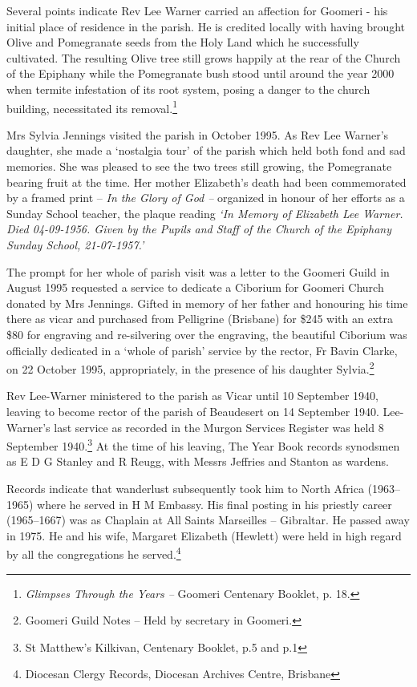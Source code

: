 Several points indicate Rev Lee Warner carried an affection for Goomeri - his initial place of residence in the parish. He is credited locally with having brought Olive and Pomegranate seeds from the Holy Land which he successfully cultivated. The resulting Olive tree still grows happily at the rear of the Church of the Epiphany while the Pomegranate bush stood until around the year 2000 when termite infestation of its root system, posing a danger to the church building, necessitated its removal.\footnote{\emph{Glimpses Through the Years --} Goomeri Centenary Booklet, p. 18.}

Mrs Sylvia Jennings visited the parish in October 1995. As Rev Lee Warner's daughter, she made a `nostalgia tour' of the parish which held both fond and sad memories. She was pleased to see the two trees still growing, the Pomegranate bearing fruit at the time. Her mother Elizabeth's death had been commemorated by a framed print -- \emph{In the Glory of God --} organized in honour of her efforts as a Sunday School teacher, the plaque reading \emph{`In Memory of Elizabeth Lee Warner. Died 04-09-1956. Given by the Pupils and Staff of the Church of the Epiphany Sunday School, 21-07-1957.'}

The prompt for her whole of parish visit was a letter to the Goomeri Guild in August 1995 requested a service to dedicate a Ciborium for Goomeri Church donated by Mrs Jennings. Gifted in memory of her father and honouring his time there as vicar and purchased from Pelligrine (Brisbane) for \$245 with an extra \$80 for engraving and re-silvering over the engraving, the beautiful Ciborium was officially dedicated in a `whole of parish' service by the rector, Fr Bavin Clarke, on 22 October 1995, appropriately, in the presence of his daughter Sylvia.\footnote{Goomeri Guild Notes -- Held by secretary in Goomeri.}

Rev Lee-Warner ministered to the parish as Vicar until 10 September 1940, leaving to become rector of the parish of Beaudesert on 14 September 1940. Lee-Warner's last service as recorded in the Murgon Services Register was held 8 September 1940.\footnote{St Matthew's Kilkivan, Centenary Booklet, p.5 and p.1} At the time of his leaving, The Year Book records synodsmen as E D G Stanley and R Reugg, with Messrs Jeffries and Stanton as wardens.

Records indicate that wanderlust subsequently took him to North Africa (1963--1965) where he served in H M Embassy. His final posting in his priestly career (1965--1667) was as Chaplain at All Saints Marseilles -- Gibraltar. He passed away in 1975. He and his wife, Margaret Elizabeth (Hewlett) were held in high regard by all the congregations he served.\footnote{Diocesan Clergy Records, Diocesan Archives Centre, Brisbane}

